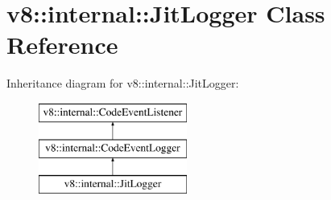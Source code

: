 \hypertarget{classv8_1_1internal_1_1JitLogger}{}\section{v8\+:\+:internal\+:\+:Jit\+Logger Class Reference}
\label{classv8_1_1internal_1_1JitLogger}
Inheritance diagram for v8\+:\+:internal\+:\+:Jit\+Logger\+:\begin{figure}[H]
\begin{center}
\leavevmode
\includegraphics[height=3.000000cm]{classv8_1_1internal_1_1JitLogger}
\end{center}
\end{figure}
